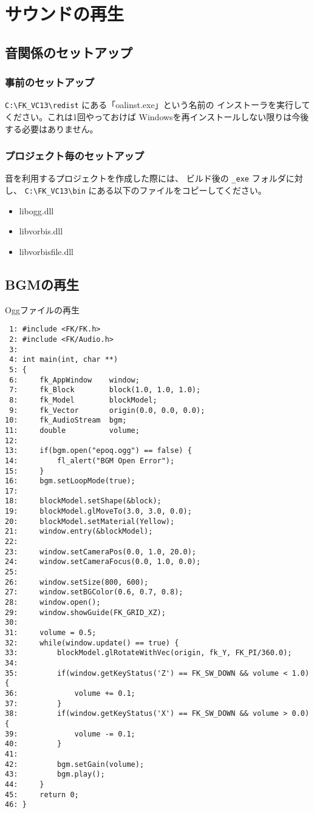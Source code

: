 \chapter{サウンドの再生}
\section{音関係のセットアップ} \label{sec:10-setup}
\subsection{事前のセットアップ}
\verb+C:\FK_VC13\redist+ にある「oalinst.exe」という名前の
	インストーラを実行してください。これは1回やっておけば
	Windowsを再インストールしない限りは今後する必要はありません。
\subsection{プロジェクト毎のセットアップ}
音を利用するプロジェクトを作成した際には、
ビルド後の \verb+_exe+ フォルダに対し、
\verb+C:\FK_VC13\bin+ にある以下のファイルをコピーしてください。
\begin{itemize}
 \item libogg.dll
 \item libvorbis.dll
 \item libvorbisfile.dll
\end{itemize}

\section{BGMの再生} \label{sec:10-ogg}
\begin{itembox}[l]{Oggファイルの再生}
\begin{small}
\begin{verbatim}
 1: #include <FK/FK.h>
 2: #include <FK/Audio.h>
 3: 
 4: int main(int, char **)
 5: {
 6:     fk_AppWindow    window;
 7:     fk_Block        block(1.0, 1.0, 1.0);
 8:     fk_Model        blockModel;
 9:     fk_Vector       origin(0.0, 0.0, 0.0);
10:     fk_AudioStream  bgm;
11:     double          volume;
12: 
13:     if(bgm.open("epoq.ogg") == false) {
14:         fl_alert("BGM Open Error");
15:     }
16:     bgm.setLoopMode(true);
17: 
18:     blockModel.setShape(&block);
19:     blockModel.glMoveTo(3.0, 3.0, 0.0);
20:     blockModel.setMaterial(Yellow);
21:     window.entry(&blockModel);
22: 
23:     window.setCameraPos(0.0, 1.0, 20.0);
24:     window.setCameraFocus(0.0, 1.0, 0.0);
25: 
26:     window.setSize(800, 600);
27:     window.setBGColor(0.6, 0.7, 0.8);
28:     window.open();
29:     window.showGuide(FK_GRID_XZ);
30: 
31:     volume = 0.5;
32:     while(window.update() == true) {
33:         blockModel.glRotateWithVec(origin, fk_Y, FK_PI/360.0);
34: 
35:         if(window.getKeyStatus('Z') == FK_SW_DOWN && volume < 1.0) {
36:             volume += 0.1;
37:         }
38:         if(window.getKeyStatus('X') == FK_SW_DOWN && volume > 0.0) {
39:             volume -= 0.1;
40:         }
41: 
42:         bgm.setGain(volume);
43:         bgm.play();
44:     }
45:     return 0;
46: }
\end{verbatim}
\end{small}
\end{itembox}
